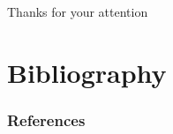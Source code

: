 \documentclass[progressbar=head]{beamer}
\begin{document}
\begin{frame}{Thanks for your attention}

\end{frame}

{
\section{Bibliography}
}

\begin{frame}[allowframebreaks]
        \frametitle{References}
\end{frame}
\end{document}
